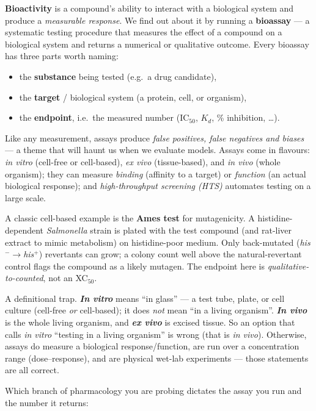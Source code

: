 \documentclass[11pt, oneside]{book}
\begin{document}
\textbf{Bioactivity} is a compound's ability to interact with a biological system
and produce a \emph{measurable response}. We find out about it by running a
\textbf{bioassay} --- a systematic testing procedure that measures the effect of a
compound on a biological system and returns a numerical or qualitative outcome.
Every bioassay has three parts worth naming:

\begin{itemize}
  \item the \textbf{substance} being tested (e.g.\ a drug candidate),
  \item the \textbf{target} / biological system (a protein, cell, or organism),
  \item the \textbf{endpoint}, i.e.\ the measured number (IC$_{50}$, $K_d$,
        \% inhibition, \dots).
\end{itemize}

Like any measurement, assays produce \emph{false positives, false negatives and
biases} --- a theme that will haunt us when we evaluate models. Assays come in
flavours: \emph{in vitro} (cell-free or cell-based), \emph{ex vivo}
(tissue-based), and \emph{in vivo} (whole organism); they can measure
\emph{binding} (affinity to a target) or \emph{function} (an actual biological
response); and \emph{high-throughput screening (HTS)} automates testing on a large
scale.

\begin{exbox}[title={An \emph{in vitro} assay: the Ames test}]
A classic cell-based example is the \textbf{Ames test} for mutagenicity. A
histidine-dependent \emph{Salmonella} strain is plated with the test compound (and
rat-liver extract to mimic metabolism) on histidine-poor medium. Only
back-mutated (\emph{his$^-$}$\to$\emph{his$^+$}) revertants can grow; a colony
count well above the natural-revertant control flags the compound as a likely
mutagen. The endpoint here is \emph{qualitative-to-counted}, not an XC$_{50}$.
\end{exbox}

\begin{starbox}[title={Exam-critical: \emph{in vitro} vs.\ \emph{in vivo}}]
A definitional trap. \textbf{\emph{In vitro}} means ``in glass'' --- a test tube,
plate, or cell culture (cell-free \emph{or} cell-based); it does \emph{not} mean
``in a living organism''. \textbf{\emph{In vivo}} is the whole living organism, and
\textbf{\emph{ex vivo}} is excised tissue. So an option that calls \emph{in vitro}
``testing in a living organism'' is wrong (that is \emph{in vivo}). Otherwise,
assays do measure a biological response/function, are run over a concentration
range (dose--response), and are physical wet-lab experiments --- those statements
are all correct.
\end{starbox}
\newpage
\noindent Which branch of pharmacology you are probing dictates the assay you run
and the number it returns:
\end{document}
